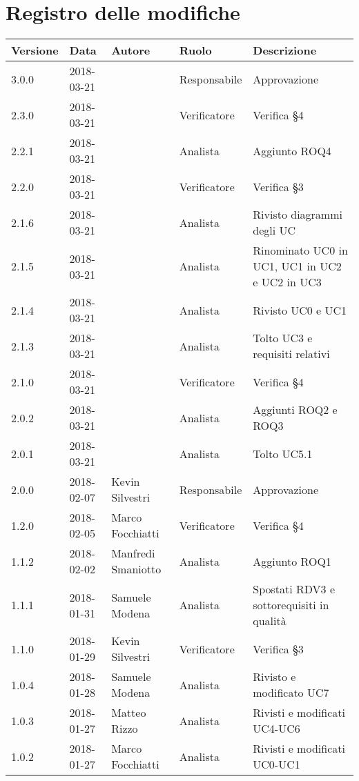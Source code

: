 \documentclass[./AnalisideiRequisiti.tex]{subfiles}
\begin{document}
	
{
	\chapter*{Registro delle modifiche}
\setlength\LTleft{-22mm}
	\begin{longtable}{|p{20mm}|p{20mm}|p{40mm}|p{30mm}|p{50mm}|}
		\hline
		\textbf{Versione} & \textbf{Data} & \textbf{Autore} & \textbf{Ruolo} & \textbf{Descrizione} \\ \hline 
		    
		3.0.0 & 2018-03-21 &  & Responsabile & Approvazione\\ \hline 
		2.3.0 & 2018-03-21 &  & Verificatore & Verifica §4\\ \hline 		
		2.2.1 & 2018-03-21 &  & Analista & Aggiunto ROQ4\\ \hline 
		2.2.0 & 2018-03-21 &  & Verificatore & Verifica §3\\ \hline 
		2.1.6 & 2018-03-21 &  & Analista & Rivisto diagrammi degli UC\\ \hline
		2.1.5 & 2018-03-21 &  & Analista & Rinominato UC0 in UC1, UC1 in UC2 e UC2 in UC3\\ \hline
		2.1.4 & 2018-03-21 &  & Analista & Rivisto UC0 e UC1\\ \hline
		2.1.3 & 2018-03-21 &  & Analista & Tolto UC3 e requisiti relativi\\ \hline
		2.1.0 & 2018-03-21 &  & Verificatore & Verifica §4\\ \hline
		2.0.2 & 2018-03-21 &  & Analista & Aggiunti ROQ2 e ROQ3\\ \hline
		2.0.1 & 2018-03-21 &  & Analista & Tolto UC5.1\\ \hline
		2.0.0 & 2018-02-07 & Kevin Silvestri & Responsabile & Approvazione\\ \hline 
		1.2.0 & 2018-02-05 & Marco Focchiatti & Verificatore & Verifica §4\\ \hline    
		1.1.2 & 2018-02-02 & Manfredi Smaniotto & Analista & Aggiunto ROQ1\\ \hline 
		1.1.1 & 2018-01-31 & Samuele Modena & Analista & Spostati RDV3 e sottorequisiti in qualità\\ \hline  
		1.1.0 & 2018-01-29 & Kevin Silvestri & Verificatore & Verifica §3\\ \hline  
		1.0.4 & 2018-01-28 & Samuele Modena & Analista & Rivisto e modificato UC7\\ \hline  
		1.0.3 & 2018-01-27 & Matteo Rizzo & Analista & Rivisti e modificati UC4-UC6\\ \hline    
		1.0.2 & 2018-01-27 & Marco Focchiatti & Analista & Rivisti e modificati UC0-UC1\\ \hline  

\end{longtable}}
\end{document}
